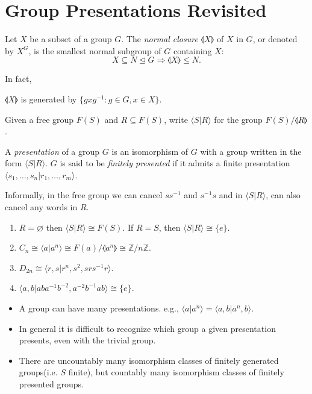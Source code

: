 \documentclass[10pt]{article}
\def\le{\leqslant}
\def\ltrigeq{\trianglelefteq}
\begin{document}
    \section{Group Presentations Revisited}
    \begin{definition}
        Let $X$ be a subset of a group $G$. The \textit{normal closure} $ \llangle X \rrangle $ of $X$ in $G$, or denoted by $ X^G $, is the smallest normal subgroup of $G$ containing $X$:
        \[
            X \subseteq N \ltrigeq G \Longrightarrow \llangle X \rrangle\le N.
        \]
    \end{definition}
    In fact,
    \begin{proposition}
        $\llangle X \rrangle$ is generated by $ \{gxg^{-1}:g\in G,x\in X\} $.
    \end{proposition}
    Given a free group $F(S)$ and $ R \subseteq F(S) $, write $ \langle S|R \rangle $ for the group $ F(S)/\llangle R \rrangle $.
    \begin{definition}
        A \textit{presentation} of a group $G$ is an isomorphism of $G$ with a group written in the form $ \langle S|R \rangle $. $G$ is said to be \textit{finitely presented} if it admits a finite presentation $ \langle s_1,\dots,s_n|r_1,\dots,r_m \rangle $.
    \end{definition}
    Informally, in the free group we can cancel $ss^{-1}$ and $ s^{-1}s $ and in $ \langle S|R \rangle  $, can also cancel any words in $R$.
    \begin{example}
        \begin{enumerate}
            \item $ R=\varnothing $ then $ \langle S|R \rangle \cong F(S) $. If $R=S$, then $ \langle S|R \rangle \cong \{e\} $.
            \item $ C_n \cong \langle a|a^n \rangle \cong F(a)/\llangle a^n\rrangle \cong \mathbb{Z} / n \mathbb{Z} $.
            \item $ D_{2n} \cong \langle r,s|r^n,s^2, srs^{-1}r \rangle  $.
            \item $ \langle a,b|aba^{-1}b^{-2},a^{-2}b^{-1}ab \rangle \cong \{e\} $.
        \end{enumerate}
    \end{example}
    \begin{remark}
        \begin{itemize}
            \item A group can have many presentations. e.g., $ \langle a|a^n \rangle =\langle a,b|a^n,b \rangle $.
            \item In general it is difficult to recognize which group a given presentation presents, even with the trivial group.
            \item There are uncountably many isomorphism classes of finitely generated groups(i.e. $S$ finite), but countably many  isomorphism classes of finitely presented groups.
        \end{itemize}
    \end{remark}
\end{document}
